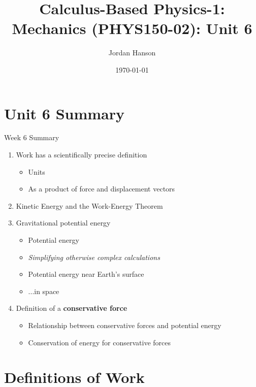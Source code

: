 \documentclass{beamer}
\title{Calculus-Based Physics-1: Mechanics (PHYS150-02): Unit 6}
\date{\today}
\author{Jordan Hanson}
\institute{Whittier College Department of Physics and Astronomy}
\begin{document}
\maketitle

\section{Unit 6 Summary}

\begin{frame}{Week 6 Summary}
\begin{enumerate}
\item \alert{Work} has a scientifically precise definition
\begin{itemize}
\item Units
\item As a product of force and displacement vectors
\end{itemize}
\item Kinetic Energy and the \alert{Work-Energy Theorem}
\item Gravitational potential energy
\begin{itemize}
\item Potential energy
\item \textit{Simplifying otherwise complex calculations}
\item Potential energy near Earth's surface
\item ...in space
\end{itemize}
\item Definition of a \textbf{conservative force}
\begin{itemize}
\item Relationship between conservative forces and potential energy
\item Conservation of energy for conservative forces
\end{itemize}
\end{enumerate}
\end{frame}

\section{Definitions of Work}
\end{document}
